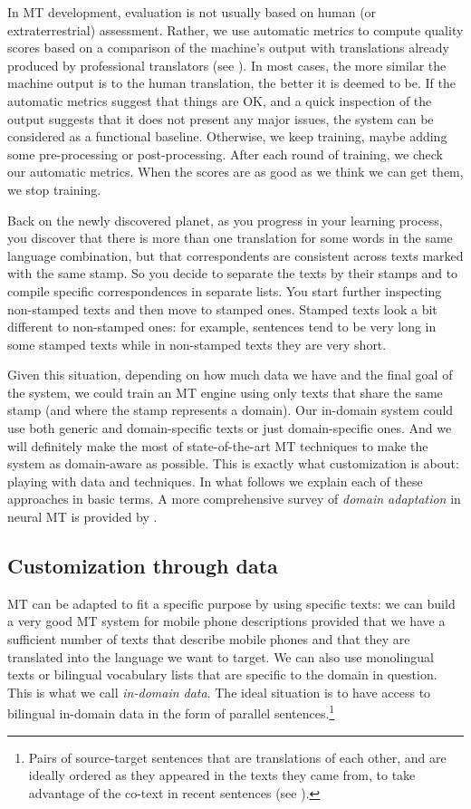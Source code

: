 \documentclass[output=paper]{langscibook}
\begin{document}
In MT development, evaluation is not usually based on human (or extraterrestrial) assessment. Rather, we use automatic metrics to compute quality scores based on a comparison of the machine's output with translations already produced by professional translators (see ). In most cases, the more similar the machine output is to the human translation, the better it is deemed to be. If the automatic metrics suggest that things are OK, and a quick inspection of the output suggests that it does not present any major issues, the system can be considered as a functional baseline. Otherwise, we keep training, maybe adding some pre-processing or post-processing. After each round of training, we check our automatic metrics. When the scores are as good as we think we can get them, we stop training.

Back on the newly discovered planet, as you progress in your learning process, you discover that there is more than one translation for some words in the same language combination, but that correspondents are consistent across texts marked with the same stamp. So you decide to separate the texts by their stamps and to compile specific correspondences in separate lists. You start further inspecting non-stamped texts and then move to stamped ones. Stamped texts look a bit different to non-stamped ones: for example, sentences tend to be very long in some stamped texts while in non-stamped texts they are very short.

Given this situation, depending on how much data we have and the final goal of the system, we could train an MT engine using only texts that share the same stamp (and where the stamp represents a domain). Our in-domain system could use both generic and domain-specific texts or just domain-specific ones. And we will definitely make the most of state-of-the-art MT techniques to make the system as  domain-aware as possible. This is exactly what customization is about: playing with data and techniques. In what follows we explain each of these approaches in basic terms. A more comprehensive survey of \textit{domain adaptation} in neural MT is provided by \citet{Saunders2021}.

\subsection{Customization through data}\label{sec:ramirez:2.1}

MT can be adapted to fit a specific purpose by using specific texts: we can build a very good MT system for mobile phone descriptions provided that we have a sufficient number of texts that describe mobile phones and that they are translated into the language we want to target. We can also use monolingual texts or bilingual vocabulary lists that are specific to the domain in question. This is what we call \textit{in-domain data}. The ideal situation is to have access to bilingual in-domain data in the form of parallel sentences.\footnote{Pairs of source-target sentences that are translations of each other, and are ideally ordered as they appeared in the texts they came from, to take advantage of the co-text in recent sentences (see ).} 
\end{document}
